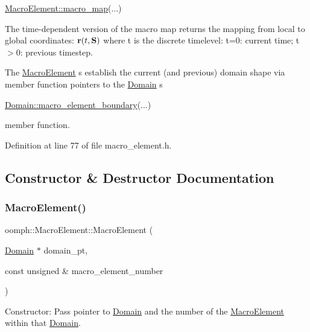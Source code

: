 \begin{DoxyCode}
\hyperlink{classoomph_1_1MacroElement_a85e7842ad949bb4062a9ff302fa452e5}{MacroElement::macro\_map}(...) 
\end{DoxyCode}


The time-\/dependent version of the macro map returns the mapping from local to global coordinates\+: $ {\bf r} (t,{\bf S}) $ where t is the discrete timelevel\+: t=0\+: current time; t$>$0\+: previous timestep.

The \hyperlink{classoomph_1_1MacroElement}{Macro\+Element} s establish the current (and previous) domain shape via member function pointers to the \hyperlink{classoomph_1_1Domain}{Domain} \textquotesingle{}s 
\begin{DoxyCode}
\hyperlink{classoomph_1_1Domain_a95f3e00d28ea37e6c4d3027bfac91096}{Domain::macro\_element\_boundary}(...) 
\end{DoxyCode}
 member function. 

Definition at line 77 of file macro\+\_\+element.\+h.



\subsection{Constructor \& Destructor Documentation}
\mbox{\label{classoomph_1_1MacroElement_ad94cc0ffda0d77e1778110da4aa651eb}} 
\subsubsection{\texorpdfstring{Macro\+Element()}{MacroElement()}\hspace{0.1cm}{\footnotesize\ttfamily [1/3]}}
{\footnotesize\ttfamily oomph\+::\+Macro\+Element\+::\+Macro\+Element (\begin{DoxyParamCaption}\item[{\hyperlink{classoomph_1_1Domain}{Domain} $\ast$}]{domain\+\_\+pt,  }\item[{const unsigned \&}]{macro\+\_\+element\+\_\+number }\end{DoxyParamCaption})\hspace{0.3cm}{\ttfamily [inline]}}



Constructor\+: Pass pointer to \hyperlink{classoomph_1_1Domain}{Domain} and the number of the \hyperlink{classoomph_1_1MacroElement}{Macro\+Element} within that \hyperlink{classoomph_1_1Domain}{Domain}. 




